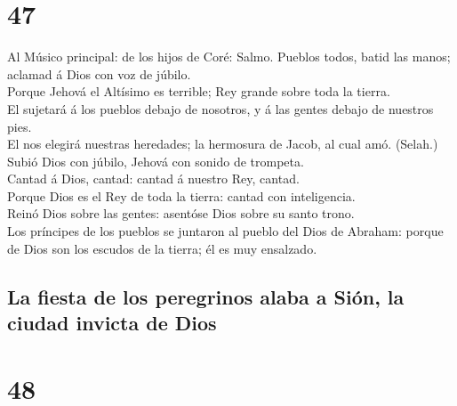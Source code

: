 \hypertarget{section-46}{%
\section{47}\label{section-46}}

 Al Músico principal: de los hijos de Coré: Salmo. Pueblos
todos, batid las manos; aclamad á Dios con voz de júbilo.\\
 Porque Jehová el Altísimo es terrible; Rey grande sobre
toda la tierra.\\
 El sujetará á los pueblos debajo de nosotros, y á las
gentes debajo de nuestros pies.\\
 El nos elegirá nuestras heredades; la hermosura de Jacob,
al cual amó. (Selah.)\\
 Subió Dios con júbilo, Jehová con sonido de trompeta.\\
 Cantad á Dios, cantad: cantad á nuestro Rey, cantad.\\
 Porque Dios es el Rey de toda la tierra: cantad con
inteligencia.\\
 Reinó Dios sobre las gentes: asentóse Dios sobre su santo
trono.\\
 Los príncipes de los pueblos se juntaron al pueblo del
Dios de Abraham: porque de Dios son los escudos de la tierra; él es muy
ensalzado.

\hypertarget{la-fiesta-de-los-peregrinos-alaba-a-siuxf3n-la-ciudad-invicta-de-dios}{%
\subsection{La fiesta de los peregrinos alaba a Sión, la ciudad invicta
de
Dios}\label{la-fiesta-de-los-peregrinos-alaba-a-siuxf3n-la-ciudad-invicta-de-dios}}

\hypertarget{section-47}{%
\section{48}\label{section-47}}

